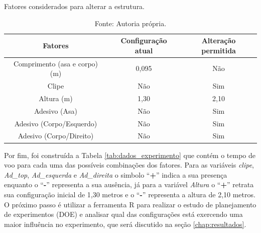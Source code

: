 \begin{table}[H]
  \caption{Fatores considerados para alterar a estrutura.}
  \centering
  \begin{tabular}{|c|c|c|}
  \hline
  \rowcolor[HTML]{EFEFEF} 
  \textbf{Fatores}              & \textbf{Configuração atual} & \textbf{Alteração permitida} \\ \hline
  Comprimento (asa e corpo) (m) & 0,095                       & Não                          \\ \hline
  \rowcolor[HTML]{EFEFEF} 
  Clipe                         & Não                         & Sim                          \\ \hline
  \rowcolor[HTML]{FFFFFF} 
  Altura (m)                    & 1,30                        & 2,10                         \\ \hline
  \rowcolor[HTML]{EFEFEF} 
  Adesivo (Asa)                 & Não                         & Sim                          \\ \hline
  \rowcolor[HTML]{FFFFFF} 
  Adesivo (Corpo/Esquerdo)         & Não                         & Sim                          \\ \hline
  \rowcolor[HTML]{EFEFEF} 
  Adesivo (Corpo/Direito)          & Não                         & Sim                          \\ \hline
  \end{tabular}
  \caption*{Fonte: Autoria própria.}
  \label{tab:fatores}
  \end{table}

Por fim, foi construída a Tabela \ref{tab:dados_experimento} que contém o tempo de voo para cada uma das possíveis combinações dos fatores. Para as variáveis \textit{clipe}, \textit{Ad\_top}, \textit{Ad\_esquerda} e \textit{Ad\_direita} o simbolo ``\textbf{+}'' indica a sua presença enquanto o ``\textbf{-}'' representa a sua ausência, já para a variável \textit{Altura} o ``\textbf{+}'' retrata sua configuração inicial de 1,30 metros e o ``\textbf{-}'' representa a altura de 2,10 metros. O próximo passo é utilizar a ferramenta R para realizar o estudo de planejamento de experimentos (DOE) e analisar qual das configurações está exercendo uma maior influência no experimento, que será discutido na seção \ref{chap:resultados}.



